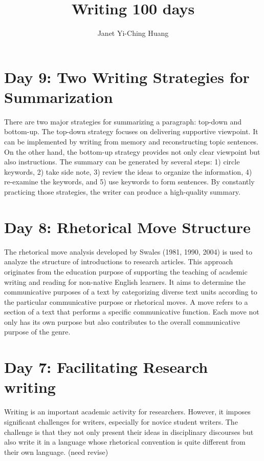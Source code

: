 \documentclass[a4paper]{article}
\title{\textbf{Writing 100 days}}
\author{Janet Yi-Ching Huang}
\begin{document}
\maketitle
\section{Day 9: Two Writing Strategies for Summarization}
There are two major strategies for summarizing a paragraph: top-down and bottom-up. The top-down strategy focuses on delivering supportive viewpoint. It can be implemented by writing from memory and reconstructing topic sentences. On the other hand, the bottom-up strategy provides not only clear viewpoint but also instructions. The summary can be generated by several steps: 1) circle keywords, 2) take side note, 3) review the ideas to organize the information, 4) re-examine the keywords, and 5) use keywords to form sentences. By constantly practicing those strategies, the writer can produce a high-quality summary.

\section{Day 8: Rhetorical Move Structure}
The rhetorical move analysis developed by Swales (1981, 1990, 2004) is used to analyze the structure of introductions to research articles. This approach originates from the education purpose of supporting the teaching of academic writing and reading for non-native English learners. It aims to determine the communicative purposes of a text by categorizing diverse text units according to the particular communicative purpose or rhetorical moves. A move refers to a section of a text that performs a specific communicative function. Each move not only has its own purpose but also contributes to the overall communicative purpose of the genre.

\section{Day 7: Facilitating Research writing}
Writing is an important academic activity for researchers. However, it imposes significant challenges for writers, especially for novice student writers. The challenge is that they not only present their ideas in disciplinary discourses but also write it in a language whose rhetorical convention is quite different from their own language. (need revise)
\end{document}
